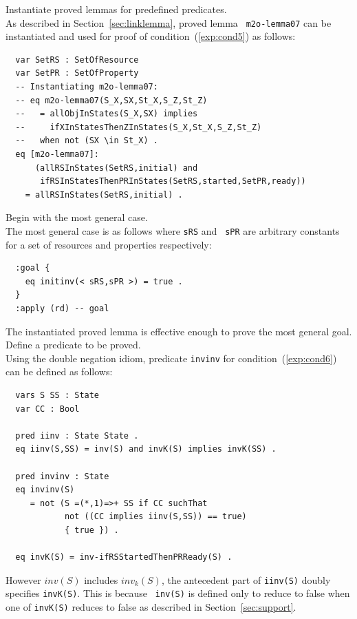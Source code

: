 \documentclass[12pt]{report}
\newcommand{\stt}[1]{{\small{\tt {#1}}}}
\begin{document}
 Instantiate proved lemmas for predefined
predicates. \\
As described in Section~\ref{sec:linklemma}, proved lemma {\tt
  m2o-lemma07} can be instantiated and used for proof of
condition~(\ref{exp:cond5}) as follows:
\small
\begin{verbatim}
  var SetRS : SetOfResource
  var SetPR : SetOfProperty
  -- Instantiating m2o-lemma07:
  -- eq m2o-lemma07(S_X,SX,St_X,S_Z,St_Z)
  --   = allObjInStates(S_X,SX) implies 
  --     ifXInStatesThenZInStates(S_X,St_X,S_Z,St_Z)
  --   when not (SX \in St_X) .
  eq [m2o-lemma07]:
      (allRSInStates(SetRS,initial) and 
       ifRSInStatesThenPRInStates(SetRS,started,SetPR,ready))
    = allRSInStates(SetRS,initial) .
\end{verbatim}
\normalsize

 Begin with the most general case. \\
The most general case is as follows where {\tt sRS} and {\tt
  sPR} are arbitrary constants for a set of resources and properties
respectively:
\small
\begin{verbatim}
  :goal {
    eq initinv(< sRS,sPR >) = true .
  }
  :apply (rd) -- goal
\end{verbatim}
\normalsize
The instantiated proved lemma is effective enough to prove the most
general goal.\\

 Define a predicate to be proved. \\ Using the
double negation idiom, predicate {\tt invinv} for
condition~(\ref{exp:cond6}) can be defined as follows:
\small
\begin{verbatim}
  vars S SS : State
  var CC : Bool

  pred iinv : State State .
  eq iinv(S,SS) = inv(S) and invK(S) implies invK(SS) .

  pred invinv : State
  eq invinv(S)
     = not (S =(*,1)=>+ SS if CC suchThat
            not ((CC implies iinv(S,SS)) == true)
            { true }) .

  eq invK(S) = inv-ifRSStartedThenPRReady(S) .
\end{verbatim}
\normalsize
However $inv(S)$ includes $inv_k(S)$, the antecedent part of
\stt{iinv(S)} doubly specifies \stt{invK(S)}. This is because {\tt
  inv(S)} is defined only to reduce to false when one of {\tt invK(S)}
reduces to false as described in Section~\ref{sec:support}.\\
\end{document}
